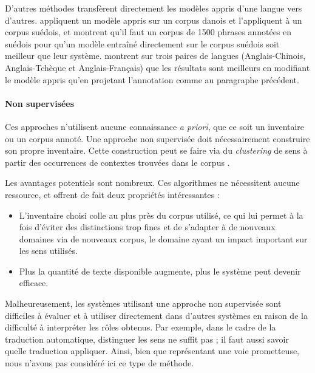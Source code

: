 
D'autres méthodes transfèrent directement les modèles appris d'une langue vers
d'autres. \citep{zeman2008cross} appliquent un modèle appris sur un corpus
danois et l'appliquent à un corpus suédois, et montrent qu'il faut un corpus de
1500 phrases annotées en suédois pour qu'un modèle entraîné directement sur le
corpus suédois soit meilleur que leur système. \citep{kozhevnikov2013cross}
montrent sur trois paires de langues (Anglais-Chinois, Anglais-Tchèque et
Anglais-Français) que les résultats sont meilleurs en modifiant le modèle
appris qu'en projetant l'annotation comme au paragraphe précédent.

\paragraph{Non supervisées}

Ces approches n'utilisent aucune connaissance \textit{a priori}, que ce soit un
inventaire ou un corpus annoté. Une approche non supervisée doit nécessairement
construire son propre inventaire. Cette construction peut se faire via du
\textit{clustering} de sens à partir des occurrences de contextes trouvées dans
le corpus
\citep{lang2011unsupervised,garg2012unsupervised,titov2012bayesian,materna2013parameter}.

Les avantages potentiels sont nombreux. Ces algorithmes ne nécessitent aucune
ressource, et offrent de fait deux propriétés intéressantes :

\begin{itemize}

    \item L'inventaire choisi colle au plus près du corpus utilisé, ce qui lui
        permet à la fois d'éviter des distinctions trop fines et de s'adapter à
        de nouveaux domaines via de nouveaux corpus, le domaine ayant un impact
        important sur les sens utilisés.

    \item Plus la quantité de texte disponible augmente, plus le système peut
        devenir efficace.

\end{itemize}

Malheureusement, les systèmes utilisant une approche non supervisée sont
difficiles à évaluer et à utiliser directement dans d'autres systèmes en raison
de la difficulté à interpréter les rôles obtenus. Par exemple, dans le cadre de
la traduction automatique, distinguer les sens ne suffit pas ; il faut aussi
savoir quelle traduction appliquer.  Ainsi, bien que représentant une voie
prometteuse, nous n'avons pas considéré ici ce type de méthode.

